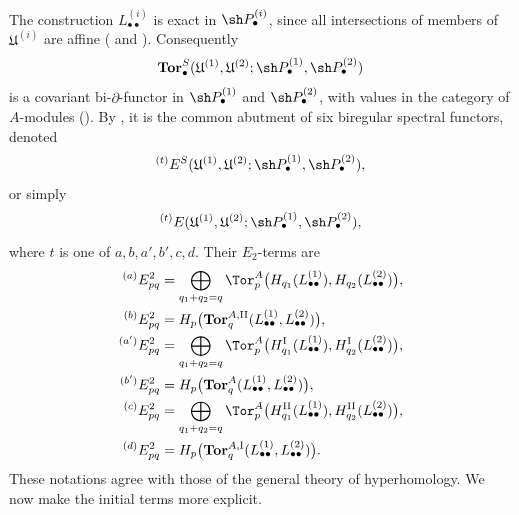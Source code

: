 \begin{env}[6.6.2]
The construction $L_{\bullet\bullet}^{(i)}$ is exact in
$\sh P_\bullet^{(i)}$, since all intersections of members of
$\mathfrak U^{(i)}$ are affine
( and ).  Consequently
\[
  \mathbf{Tor}_\bullet^S
  (\mathfrak U^{(1)},\mathfrak U^{(2)};
   \sh P_\bullet^{(1)},\sh P_\bullet^{(2)})
\]
is a covariant bi-$\partial$-functor in
$\sh P_\bullet^{(1)}$ and $\sh P_\bullet^{(2)}$, with values in
the category of $A$-modules ().  By
, it is the common abutment of six biregular
spectral functors, denoted
\[
  {}^{(t)}E^S
  (\mathfrak U^{(1)},\mathfrak U^{(2)};
   \sh P_\bullet^{(1)},\sh P_\bullet^{(2)}),
\]
or simply
\[
  {}^{(t)}E
  (\mathfrak U^{(1)},\mathfrak U^{(2)};
   \sh P_\bullet^{(1)},\sh P_\bullet^{(2)}),
\]
where $t$ is one of $a,b,a',b',c,d$.  Their $E_2$-terms are
\[
\begin{aligned}
  {}^{(a)}E_{pq}^2
  &=
  \bigoplus_{q_1+q_2=q}
  \Tor_p^A
  \bigl(H_{q_1}(L_{\bullet\bullet}^{(1)}),
        H_{q_2}(L_{\bullet\bullet}^{(2)})\bigr),\\
  {}^{(b)}E_{pq}^2
  &=
  H_p\bigl(
    \mathbf{Tor}_q^{A,\mathrm{II}}
    (L_{\bullet\bullet}^{(1)},L_{\bullet\bullet}^{(2)})
  \bigr),\\
  {}^{(a')}E_{pq}^2
  &=
  \bigoplus_{q_1+q_2=q}
  \Tor_p^A
  \bigl(H_{q_1}^{\mathrm I}(L_{\bullet\bullet}^{(1)}),
        H_{q_2}^{\mathrm I}(L_{\bullet\bullet}^{(2)})\bigr),\\
  {}^{(b')}E_{pq}^2
  &=
  H_p\bigl(
    \mathbf{Tor}_q^A
    (L_{\bullet\bullet}^{(1)},L_{\bullet\bullet}^{(2)})
  \bigr),\\
  {}^{(c)}E_{pq}^2
  &=
  \bigoplus_{q_1+q_2=q}
  \Tor_p^A
  \bigl(H_{q_1}^{\mathrm{II}}(L_{\bullet\bullet}^{(1)}),
        H_{q_2}^{\mathrm{II}}(L_{\bullet\bullet}^{(2)})\bigr),\\
  {}^{(d)}E_{pq}^2
  &=
  H_p\bigl(
    \mathbf{Tor}_q^{A,\mathrm I}
    (L_{\bullet\bullet}^{(1)},L_{\bullet\bullet}^{(2)})
  \bigr).
\end{aligned}
\]
These notations agree with those of the general theory of
hyperhomology.  We now make the initial terms more explicit.
\end{env}

